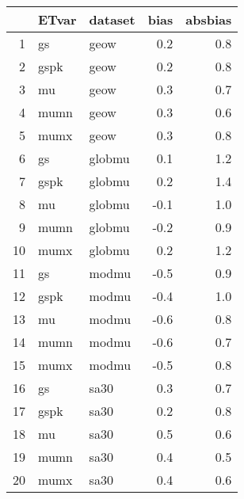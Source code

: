 \begin{table}[ht]
\centering
\begin{tabular}{rllrr}
  \hline
 & ETvar & dataset & bias & absbias \\ 
  \hline
1 & gs & geow & 0.2 & 0.8 \\ 
  2 & gspk & geow & 0.2 & 0.8 \\ 
  3 & mu & geow & 0.3 & 0.7 \\ 
  4 & mumn & geow & 0.3 & 0.6 \\ 
  5 & mumx & geow & 0.3 & 0.8 \\ 
  6 & gs & globmu & 0.1 & 1.2 \\ 
  7 & gspk & globmu & 0.2 & 1.4 \\ 
  8 & mu & globmu & -0.1 & 1.0 \\ 
  9 & mumn & globmu & -0.2 & 0.9 \\ 
  10 & mumx & globmu & 0.2 & 1.2 \\ 
  11 & gs & modmu & -0.5 & 0.9 \\ 
  12 & gspk & modmu & -0.4 & 1.0 \\ 
  13 & mu & modmu & -0.6 & 0.8 \\ 
  14 & mumn & modmu & -0.6 & 0.7 \\ 
  15 & mumx & modmu & -0.5 & 0.8 \\ 
  16 & gs & sa30 & 0.3 & 0.7 \\ 
  17 & gspk & sa30 & 0.2 & 0.8 \\ 
  18 & mu & sa30 & 0.5 & 0.6 \\ 
  19 & mumn & sa30 & 0.4 & 0.5 \\ 
  20 & mumx & sa30 & 0.4 & 0.6 \\ 
   \hline
\end{tabular}
\end{table}
